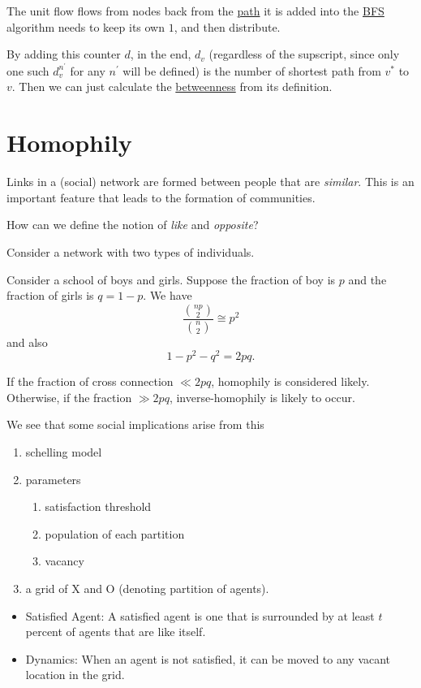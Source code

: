 The unit flow flows from nodes back from the \hyperref[def:path]{path} it is added into the \hyperref[algo:BFS]{BFS} algorithm needs to keep its own \(1\), and then distribute.

\begin{remark}
	By adding this counter \(d\), in the end, \(d_v\) (regardless of the supscript, since only one such \(d_v^{n^\prime }\) for any \(n^\prime \) will be defined) is the number of shortest path from \(v^{\ast} \) to \(v\). Then we can just calculate the \hyperref[def:betweenness]{betweenness} from its definition.
\end{remark}

\section{Homophily}
Links in a (social) network are formed between people that are \emph{similar}. This is an important feature that leads to the formation of communities.

\begin{problem}
How can we define the notion of \emph{like} and \emph{opposite}?
\end{problem}
\begin{answer}
	Consider a network with two types of individuals.
\end{answer}

\begin{eg}
	Consider a school of boys and girls. Suppose the fraction of boy is $p$ and the fraction of girls is $q = 1 - p$. We have
	\[
		\frac{\binom{np}{2}}{\binom{n}{2}} \cong p^2
	\]
	and also
	\[
		1 - p^2 - q^2 = 2pq.
	\]

	If the fraction of cross connection $\ll 2pq$, homophily is considered likely. Otherwise, if the fraction $\gg 2pq$, inverse-homophily is likely to occur.
\end{eg}

We see that some social implications arise from this
\begin{enumerate}
	\item schelling model
	\item parameters
	      \begin{enumerate}
		      \item satisfaction threshold
		      \item population of each partition
		      \item vacancy
	      \end{enumerate}
	\item a grid of X and O (denoting partition of agents).
\end{enumerate}

\begin{itemize}
	\item Satisfied Agent: A satisfied agent is one that is surrounded by at least \(t\) percent of agents that are like itself.
	\item Dynamics: When an agent is not satisfied, it can be moved to any vacant location in the grid.
\end{itemize}

